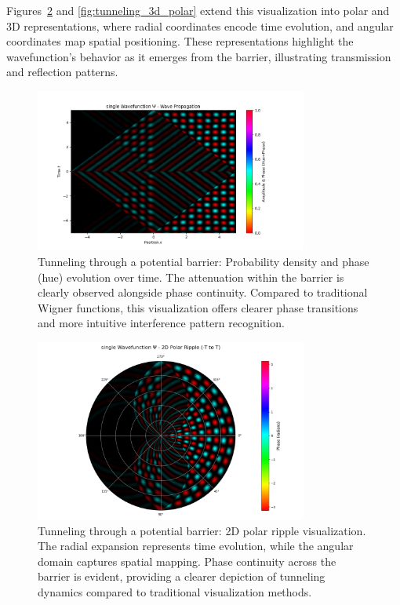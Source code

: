 \documentclass[12pt]{article}
\begin{document}
Figures~\ref{fig:tunneling_2d_polar} and \ref{fig:tunneling_3d_polar} extend this visualization into polar and 3D representations, where radial coordinates encode time evolution, and angular coordinates map spatial positioning. These representations highlight the wavefunction’s behavior as it emerges from the barrier, illustrating transmission and reflection patterns.

\begin{figure}[H]
\centering
\includegraphics[width=0.8\textwidth]{images/tunneling_wavefunction_probability_density_with_phase.png}
\caption{Tunneling through a potential barrier: Probability density and phase (hue) evolution over time. The attenuation within the barrier is clearly observed alongside phase continuity. Compared to traditional Wigner functions, this visualization offers clearer phase transitions and more intuitive interference pattern recognition.}
\label{fig:tunneling_density}
\end{figure}

\begin{figure}[H]
\centering
\includegraphics[width=0.8\textwidth]{images/tunneling_wavefunction_2d_polar_probability_density_with_phase.png}
\caption{Tunneling through a potential barrier: 2D polar ripple visualization. The radial expansion represents time evolution, while the angular domain captures spatial mapping. Phase continuity across the barrier is evident, providing a clearer depiction of tunneling dynamics compared to traditional visualization methods.}
\label{fig:tunneling_2d_polar}
\end{figure}
\end{document}
